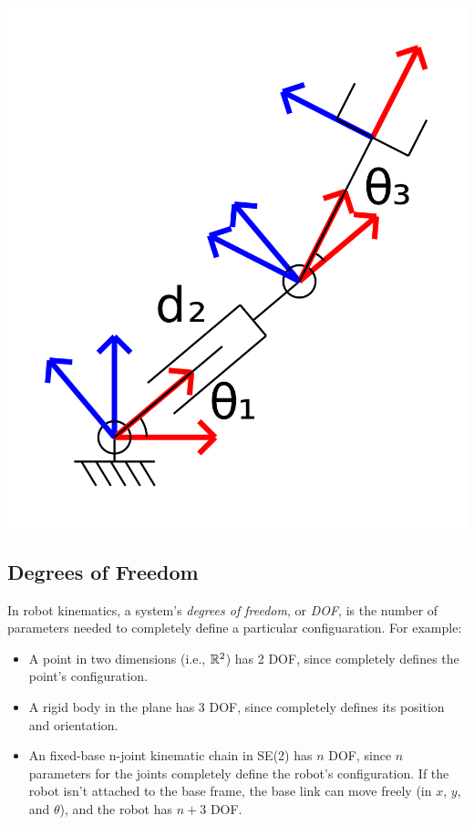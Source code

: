 \documentclass{16384_doc}
\begin{document}
\begin{center}
\includegraphics[scale=0.05]{generated_figures/bg_example_diagram_3.png}
\end{center}

\subsection{Degrees of Freedom}

In robot kinematics, a system's \emph{degrees of freedom}, or \emph{DOF}, is the number
of parameters needed to completely define a particular configuaration.  For example:

\begin{itemize}
    \item A point in two dimensions (i.e., $\RR^2$) has 2 DOF, since  completely
        defines the point's configuration.

    \item A rigid body in the plane has 3 DOF, since 
        completely defines its position and orientation.

    \item An fixed-base n-joint kinematic chain in SE(2) has $n$ DOF, since $n$
    parameters for the joints completely define the robot's configuration.  If
    the robot isn't attached to the base frame, the base link can move freely
    (in $x$, $y$, and $\theta$), and the robot has $n + 3$ DOF.
\end{itemize}
\end{document}
